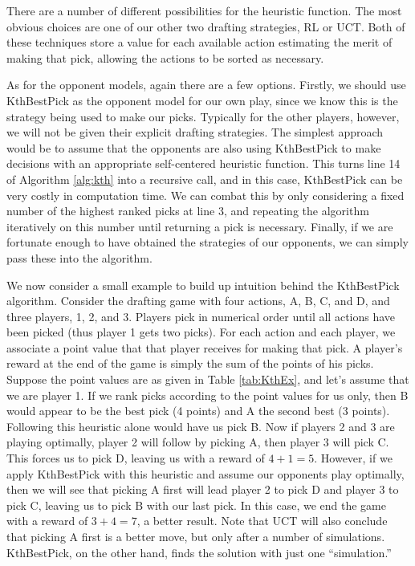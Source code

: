 \documentclass[letterpaper]{article}
\numberwithin{equation}{section}
\numberwithin{theorem}{section}
\numberwithin{lemma}{section}
\numberwithin{df}{section}
\begin{document}
There are a number of different possibilities for the heuristic function.  The most obvious choices are one of our other two drafting strategies, RL or UCT.  Both of these techniques store a value for each available action estimating the merit of making that pick, allowing the actions to be sorted as necessary.

As for the opponent models, again there are a few options.  Firstly, we should use KthBestPick as the opponent model for our own play, since we know this is the strategy being used to make our picks.  Typically for the other players, however, we will not be given their explicit drafting strategies.  The simplest approach would be to assume that the opponents are also using KthBestPick to make decisions with an appropriate self-centered heuristic function.  This turns line 14 of Algorithm \ref{alg:kth} into a recursive call, and in this case, KthBestPick can be very costly in computation time.  We can combat this by only considering a fixed number of the highest ranked picks at line 3, and repeating the algorithm iteratively on this number until returning a pick is necessary.  Finally, if we are fortunate enough to have obtained the strategies of our opponents, we can simply pass these into the algorithm.

We now consider a small example to build up intuition behind the KthBestPick algorithm.  Consider the drafting game with four actions, A, B, C, and D, and three players, 1, 2, and 3.  Players pick in numerical order until all actions have been picked (thus player 1 gets two picks).  For each action and each player, we associate a point value that that player receives for making that pick.  A player's reward at the end of the game is simply the sum of the points of his picks.  Suppose the point values are as given in Table \ref{tab:KthEx}, and let's assume that we are player 1.  If we rank picks according to the point values for us only, then B would appear to be the best pick (4 points) and A the second best (3 points).  Following this heuristic alone would have us pick B.  Now if players 2 and 3 are playing optimally, player 2 will follow by picking A, then player 3 will pick C.  This forces us to pick D, leaving us with a reward of $4 + 1 = 5$.  However, if we apply KthBestPick with this heuristic and assume our opponents play optimally, then we will see that picking A first will lead player 2 to pick D and player 3 to pick C, leaving us to pick B with our last pick.  In this case, we end the game with a reward of $3 + 4 = 7$, a better result.  Note that UCT will also conclude that picking A first is a better move, but only after a number of simulations.  KthBestPick, on the other hand, finds the solution with just one ``simulation.'' 
\end{document}
